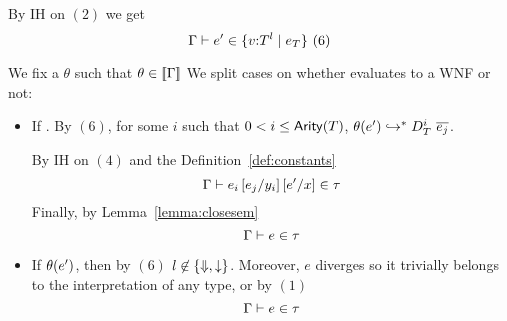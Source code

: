 \begin{enumerate}
\begin{itemize}
By IH on $(2)$ we get 
$$
	\shastype{\Gamma}{e'}{\tref{v}{T}{l}{e_T}}\ (6)
$$

We fix a $\theta$ such that $\iswellformedtheta{\Gamma}{\theta}$
We split cases on whether  evaluates to a WNF or not:
\begin{itemize}
\item If .
By $(6)$, for some $i$ such that $0 < i \leq \arity{T}$, 
%
$\evals{\thetasub{\theta}{e'}}{D^i_T\ \overline{e_j}}$.

By IH on $(4)$ and the Definition~\ref{def:constants}
$$
		\shastype{\Gamma}{e_i\sub{y_i}{e_j}\sub{x}{e'}}{\tau}
$$
Finally, by Lemma~\ref{lemma:closesem}
$$
		\shastype{\Gamma}{e}{\tau}
$$
\item If $\thetasub{\theta}{e'}$, then by $(6)$
$l \not \in \{\finite, \trivial \}$.
Moreover, $e$ diverges so it trivially belongs to the 
interpretation of any \Div type, or by $(1)$
$$
		\shastype{\Gamma}{e}{\tau}
$$
\end{itemize}
\end{itemize}
\end{enumerate}
